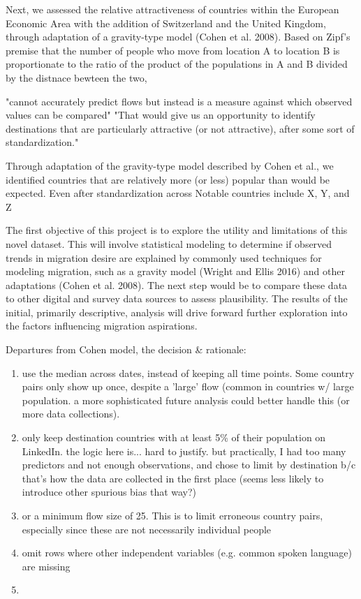 Next, we assessed the relative attractiveness of countries within the European Economic Area with the addition of Switzerland and the United Kingdom, through adaptation of a gravity-type model (Cohen et al. 2008). Based on Zipf's premise that the number of people who move from location A to location B is proportionate to the ratio of the product of the populations in A and B divided by the distnace bewteen the two, 

"cannot accurately predict flows but instead is a measure against which observed values can be compared"
"That would give us an opportunity to identify destinations that are particularly attractive (or not attractive), after some sort of standardization."

Through adaptation of the gravity-type model described by Cohen et al., we identified countries that are relatively more (or less) popular than would be expected. Even after standardization across Notable countries include X, Y, and Z

The first objective of this project is to explore the utility and limitations of this novel dataset. This will involve statistical modeling to determine if observed trends in migration desire are explained by commonly used techniques for modeling migration, such as a gravity model (Wright and Ellis 2016) and other adaptations (Cohen et al. 2008). The next step would be to compare these data to other digital and survey data sources to assess plausibility. The results of the initial, primarily descriptive, analysis will drive forward further exploration into the factors influencing migration aspirations.

Departures from Cohen model, the decision \& rationale:
\begin{enumerate}
    \item use the median across dates, instead of keeping all time points. Some country pairs only show up once, despite a 'large' flow (common in countries w/ large population. a more sophisticated future analysis could better handle this (or more data collections).
    \item only keep destination countries with at least 5\% of their population on LinkedIn. the logic here is... hard to justify. but practically, I had too many predictors and not enough observations, and chose to limit by destination b/c that's how the data are collected in the first place (seems less likely to introduce other spurious bias that way?)
    \item or a minimum flow size of 25. This is to limit erroneous country pairs, especially since these are not necessarily individual people
    \item omit rows where other independent variables (e.g. common spoken language) are missing
    \item 
\end{enumerate}

